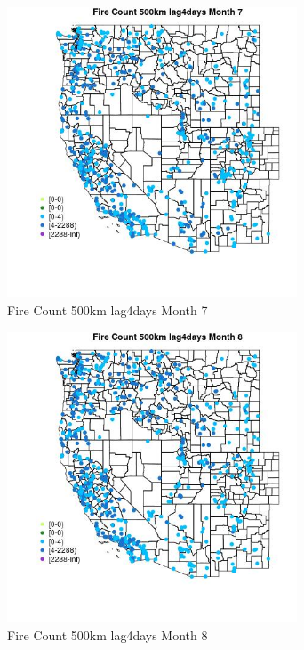 \begin{figure} 
\centering  
\includegraphics[width=0.77\textwidth]{Code_Outputs/Report_ML_input_PM25_Step4_part_e_de_duplicated_aves_compiled_2019-05-21wNAs_MapObsMo7Fire_Count_500km_lag4days.jpg} 
\caption{\label{fig:Report_ML_input_PM25_Step4_part_e_de_duplicated_aves_compiled_2019-05-21wNAsMapObsMo7Fire_Count_500km_lag4days}Fire Count 500km lag4days Month 7} 
\end{figure} 
 

\begin{figure} 
\centering  
\includegraphics[width=0.77\textwidth]{Code_Outputs/Report_ML_input_PM25_Step4_part_e_de_duplicated_aves_compiled_2019-05-21wNAs_MapObsMo8Fire_Count_500km_lag4days.jpg} 
\caption{\label{fig:Report_ML_input_PM25_Step4_part_e_de_duplicated_aves_compiled_2019-05-21wNAsMapObsMo8Fire_Count_500km_lag4days}Fire Count 500km lag4days Month 8} 
\end{figure} 
 

